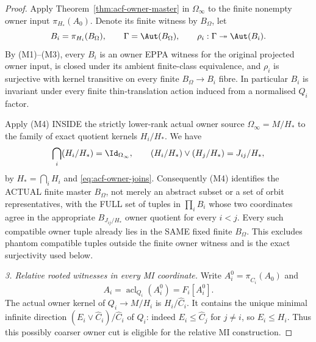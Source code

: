 \begin{proof}
Apply Theorem~\ref{thm:acf-owner-master} in
\(\Omega_\infty\) to the finite nonempty owner
input \(\pi_{H_*}(A_0)\).  Denote its finite
witness by \(B_\Omega\), let
\[
  B_i=\pi_{H_i}(B_\Omega),\qquad
  \Gamma=\Aut(B_\Omega),\qquad
  \rho_i:\Gamma\twoheadrightarrow\Aut(B_i).
\]
By (M1)--(M3), every \(B_i\) is an owner
EPPA witness for the original projected owner
input, is closed under its ambient finite-class
equivalence, and \(\rho_i\) is surjective with
kernel transitive on every finite
\(B_\Omega\to B_i\) fibre.  In particular
\(B_i\) is invariant under every finite
thin-translation action induced from
a normalised \(Q_i\) factor.

Apply (M4) INSIDE the strictly lower-rank
actual owner source \(\Omega_\infty=M/H_*\)
to the family of exact quotient kernels
\(H_i/H_*\). We have
\[
 \bigcap_i(H_i/H_*)=\Id_{\Omega_\infty},
 \qquad
 (H_i/H_*)\vee(H_j/H_*)
                =J_{ij}/H_*,
\]
by \(H_*=\bigcap_iH_i\) and
\eqref{eq:acf-owner-joins}.
Consequently (M4) identifies the ACTUAL
finite master \(B_\Omega\), not merely
an abstract subset or a set of orbit
representatives, with the FULL set of
tuples in \(\prod_i B_i\) whose two
coordinates agree in the appropriate
\(B_{J_{ij}/H_*}\) owner quotient
for every \(i<j\).
Every such compatible owner tuple
already lies in the SAME fixed finite
\(B_\Omega\). This excludes phantom
compatible tuples outside the finite
owner witness and is the exact
surjectivity used below.

\medskip\noindent
\emph{3. Relative rooted witnesses in every MI coordinate.}
Write \(A_i^0=\pi_{\widehat C_i}(A_0)\) and
\[
              A_i=\operatorname{acl}_{Q_i}(A_i^0)
                    =F_i[A_i^0].
\]
The actual owner kernel of \(Q_i\to M/H_i\)
is \(H_i/\widehat C_i\).  It contains the unique
minimal infinite direction
\((E_i\vee \widehat C_i)/\widehat C_i\) of \(Q_i\):
indeed \(E_i\le \widehat C_j\) for \(j\ne i\),
so \(E_i\le H_i\).
Thus this possibly coarser owner cut is
eligible for the relative MI construction.


\end{proof}
